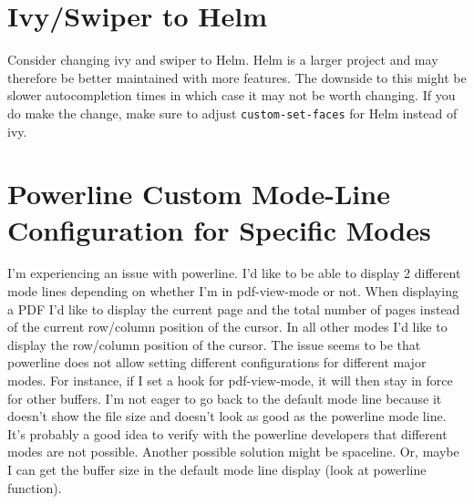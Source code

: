 \documentclass{default}
\begin{document}
\section{Ivy/Swiper to Helm}\label{sec:ivyswiper-helm}

Consider changing ivy and swiper to Helm. Helm is a larger project and may therefore be better
maintained with more features. The downside to this might be slower autocompletion times in which
case it may not be worth changing. If you do make the change, make sure to adjust
\lstinline{custom-set-faces} for Helm instead of ivy.


\section{Powerline Custom Mode-Line Configuration for Specific Modes}
\label{sec:powerl-cust-mode}

I'm experiencing an issue with powerline. I'd like to be able to display 2 different mode lines
depending on whether I'm in pdf-view-mode or not. When displaying a PDF I'd like to display the
current page and the total number of pages instead of the current row/column position of the
cursor. In all other modes I'd like to display the row/column position of the cursor. The issue
seems to be that powerline does not allow setting different configurations for different major
modes. For instance, if I set a hook for pdf-view-mode, it will then stay in force for other
buffers. I'm not eager to go back to the default mode line because it doesn't show the file size and
doesn't look as good as the powerline mode line. It's probably a good idea to verify with the
powerline developers that different modes are not possible. Another possible solution might be
spaceline. Or, maybe I can get the buffer size in the default mode line display (look at powerline
function).
\end{document}
